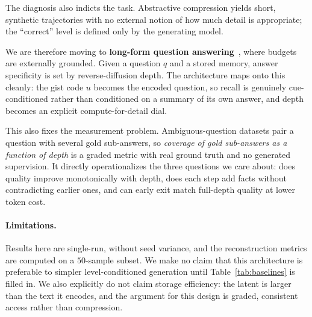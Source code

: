 \documentclass{article}
\begin{document}
The diagnosis also indicts the task. Abstractive compression yields short, synthetic trajectories with no external notion of how much detail is appropriate; the ``correct'' level is defined only by the generating model.

We are therefore moving to \textbf{long-form question answering}~\citep{fan2019,stelmakh2022}, where budgets are externally grounded. Given a question $q$ and a stored memory, answer specificity is set by reverse-diffusion depth. The architecture maps onto this cleanly: the gist code $u$ becomes the encoded question, so recall is genuinely cue-conditioned rather than conditioned on a summary of its own answer, and depth becomes an explicit compute-for-detail dial.

This also fixes the measurement problem. Ambiguous-question datasets pair a question with several gold sub-answers, so \emph{coverage of gold sub-answers as a function of depth} is a graded metric with real ground truth and no generated supervision. It directly operationalizes the three questions we care about: does quality improve monotonically with depth, does each step add facts without contradicting earlier ones, and can early exit match full-depth quality at lower token cost.

\paragraph{Limitations.}
Results here are single-run, without seed variance, and the reconstruction metrics are computed on a $50$-sample subset. We make no claim that this architecture is preferable to simpler level-conditioned generation until Table~\ref{tab:baselines} is filled in. We also explicitly do not claim storage efficiency: the latent is larger than the text it encodes, and the argument for this design is graded, consistent access rather than compression.
\end{document}
